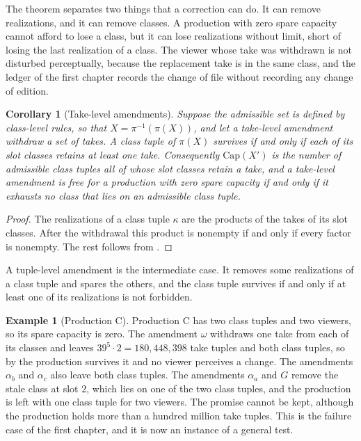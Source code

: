 \documentclass[11pt,twoside,openright]{book}
\theoremstyle{plain}
\newtheorem{corollary}[theorem]{Corollary}
\theoremstyle{definition}
\newtheorem{example}[theorem]{Example}
\theoremstyle{remark}
\newcommand{\Capac}{\mathrm{Cap}}
\begin{document}
The theorem separates two things that a correction can do. It can remove realizations, and it can remove classes. A production with zero spare capacity cannot afford to lose a class, but it can lose realizations without limit, short of losing the last realization of a class. The viewer whose take was withdrawn is not disturbed perceptually, because the replacement take is in the same class, and the ledger of the first chapter records the change of file without recording any change of edition.

\begin{corollary}[Take-level amendments]\label{cor:take}
Suppose the admissible set is defined by class-level rules, so that $X=\pi^{-1}(\pi(X))$, and let a take-level amendment withdraw a set of takes. A class tuple of $\pi(X)$ survives if and only if each of its slot classes retains at least one take. Consequently $\Capac(X')$ is the number of admissible class tuples all of whose slot classes retain a take, and a take-level amendment is free for a production with zero spare capacity if and only if it exhausts no class that lies on an admissible class tuple.
\end{corollary}

\begin{proof}
The realizations of a class tuple $\kappa$ are the products of the takes of its slot classes. After the withdrawal this product is nonempty if and only if every factor is nonempty. The rest follows from .
\end{proof}

A tuple-level amendment is the intermediate case. It removes some realizations of a class tuple and spares the others, and the class tuple survives if and only if at least one of its realizations is not forbidden.

\begin{example}[Production C]\label{ex:C}
Production C has two class tuples and two viewers, so its spare capacity is zero. The amendment $\omega$ withdraws one take from each of its classes and leaves $39^5\cdot2=180{,}448{,}398$ take tuples and both class tuples, so by  the production survives it and no viewer perceives a change. The amendments $\alpha_b$ and $\alpha_c$ also leave both class tuples. The amendments $\alpha_a$ and $G$ remove the stale class at slot $2$, which lies on one of the two class tuples, and the production is left with one class tuple for two viewers. The promise cannot be kept, although the production holds more than a hundred million take tuples. This is the failure case of the first chapter, and it is now an instance of a general test.
\end{example}
\end{document}
